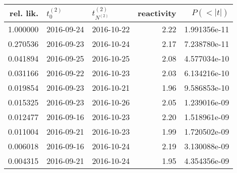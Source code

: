 \begin{tabular}{rllrr}
\toprule
 rel. lik. & $t_0^{(2)}$ & $t^{(2)}_{N^{(2)}}$ & reactivity &     $P(<|t|)$ \\
\midrule
  1.000000 &  2016-09-24 &          2016-10-22 &       2.22 &  1.991356e-11 \\
  0.270536 &  2016-09-23 &          2016-10-24 &       2.17 &  7.238780e-11 \\
  0.041894 &  2016-09-25 &          2016-10-25 &       2.08 &  4.577034e-10 \\
  0.031166 &  2016-09-22 &          2016-10-23 &       2.03 &  6.134216e-10 \\
  0.019854 &  2016-09-23 &          2016-10-21 &       1.96 &  9.586853e-10 \\
  0.015325 &  2016-09-23 &          2016-10-26 &       2.05 &  1.239016e-09 \\
  0.012477 &  2016-09-16 &          2016-10-23 &       2.20 &  1.518961e-09 \\
  0.011004 &  2016-09-21 &          2016-10-23 &       1.99 &  1.720502e-09 \\
  0.006018 &  2016-09-16 &          2016-10-24 &       2.19 &  3.130088e-09 \\
  0.004315 &  2016-09-21 &          2016-10-24 &       1.95 &  4.354356e-09 \\
\bottomrule
\end{tabular}
